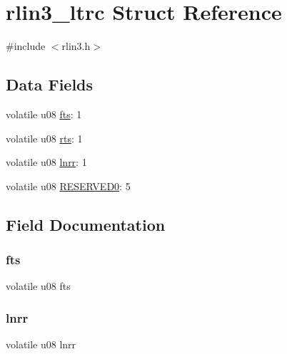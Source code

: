\hypertarget{structrlin3__ltrc}{}\section{rlin3\+\_\+ltrc Struct Reference}
\label{structrlin3__ltrc}


{\ttfamily \#include $<$rlin3.\+h$>$}

\subsection*{Data Fields}
\begin{DoxyCompactItemize}
\item 
volatile u08 \mbox{\hyperlink{structrlin3__ltrc_abee89476e726cecedf50e5582ab6f0d8}{fts}}\+: 1
\item 
volatile u08 \mbox{\hyperlink{structrlin3__ltrc_a751ec957e40bc4d328ed203db01c32e2}{rts}}\+: 1
\item 
volatile u08 \mbox{\hyperlink{structrlin3__ltrc_ad13d4c70e0bf3ec4f00945112ceff36e}{lnrr}}\+: 1
\item 
volatile u08 \mbox{\hyperlink{structrlin3__ltrc_a59c0b30ccfb89f1b34e9682741859abd}{R\+E\+S\+E\+R\+V\+E\+D0}}\+: 5
\end{DoxyCompactItemize}


\subsection{Field Documentation}
\mbox{\label{structrlin3__ltrc_abee89476e726cecedf50e5582ab6f0d8}} 
\subsubsection{\texorpdfstring{fts}{fts}}
{\footnotesize\ttfamily volatile u08 fts}

\mbox{\label{structrlin3__ltrc_ad13d4c70e0bf3ec4f00945112ceff36e}} 
\subsubsection{\texorpdfstring{lnrr}{lnrr}}
{\footnotesize\ttfamily volatile u08 lnrr}

